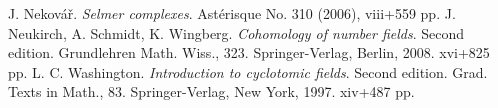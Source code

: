 \begin{thebibliography}{XXXX}
J. Nekov\'{a}\v{r}.
\emph{Selmer complexes}.
Ast\'erisque No. 310 (2006), viii+559 pp.
J. Neukirch, A. Schmidt, K. Wingberg.
\emph{Cohomology of number fields}.
Second edition.
Grundlehren Math. Wiss., 323.
Springer-Verlag, Berlin, 2008. xvi+825 pp.
L. C. Washington.
\emph{Introduction to cyclotomic fields}.
Second edition.
Grad. Texts in Math., 83.
Springer-Verlag, New York, 1997. xiv+487 pp.
\end{thebibliography}
